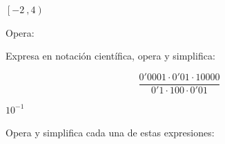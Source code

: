 \documentclass[addpoints,spanish, 12pt,a4paper]{exam}
\begin{document}
\begin{questions}
\begin{solution}
$\left[-2 \ , 4\right)$ 
\end{solution}

\question Opera:


\addpoints

\question[2] Expresa en notación científica, opera y simplifica:
\addpoints 

$$\dfrac{0'0001\cdot0'01\cdot10000}{0'1\cdot100\cdot0'01}$$
\begin{solution} $10^{-1}$ \end{solution}
 

\question Opera y simplifica cada una de estas expresiones:

\end{questions}
\end{document}
